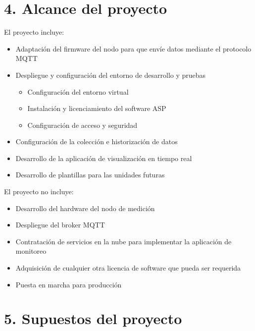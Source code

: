 \documentclass[
11pt, %
]{charter}
\begin{document}
\section{4. Alcance del proyecto}
\label{sec:alcance}
El proyecto incluye:
\begin{itemize}
	\item Adaptación del firmware del nodo para que envíe datos mediante el protocolo MQTT
	\item Despliegue y configuración del entorno de desarrollo y pruebas
		\begin{itemize}
		\item Configuración del entorno virtual
		\item Instalación y licenciamiento del software ASP
		\item Configuración de acceso y seguridad
		\end{itemize}
	\item Configuración de la colección e historización de datos
	\item Desarrollo de la aplicación de visualización en tiempo real
	\item Desarrollo de plantillas para las unidades futuras
	
\end{itemize}

El proyecto no incluye:
\begin{itemize}
	\item Desarrollo del hardware del nodo de medición
	\item Despliegue del broker MQTT
	\item Contratación de servicios en la nube para implementar la aplicación de monitoreo
	\item Adquisición de cualquier otra licencia de software que pueda ser requerida
	\item Puesta en marcha para producción
	
\end{itemize}

\section{5. Supuestos del proyecto}
\label{sec:supuestos}
\end{document}
